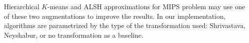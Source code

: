 Hierarchical $K$-means and ALSH approximations for MIPS problem may use one
of these two augmentations to improve the results. In our implementation,
algorithms are parametrized by the type of the transformation used: Shrivastava,
Neyshabur, or no transformation as a baseline. 
